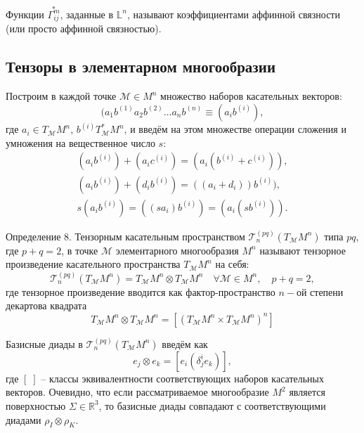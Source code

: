\documentclass[14pt,a4paper]{extarticle}
\begin{document}
Функции $\overset{*}{\Gamma_{ij}^m}$, заданные в $\mathbb{L}^n$, называют коэффициентами аффинной связности (или просто аффинной связностью).

\subsection{Тензоры в элементарном многообразии}
Построим в каждой точке $\mathcal{M} \in M^n$ множество наборов касательных векторов:
\begin{equation}\label{eq15}
	(a_1b^{(1)}a_2b^{(2)}\ldots a_nb^{(n)} \equiv (a_ib^{(i)}),
\end{equation}
где $a_i \in T_{\mathcal{M}}M^n$, $b^{(i)} T_{\mathcal{M}}^*M^n$, и введём на этом множестве операции сложения и умножения на вещественное число $s$:
\begin{align}
	(a_ib^{(i)}) + (a_ic^{(i)}) = (a_i(b^{(i)} + c^{(i)})),\label{eq16}\\
	(a_ib^{(i)}) + (d_ib^{(i)}) = ((a_i+d_i)) b^{(i)}),\label{eq17}\\
	s(a_ib^{(i)}) = ((sa_i)b^{(i)}) = (a_i(sb^{(i)})). \label{eq18}
\end{align}

Определение 8. Тензорным касательным пространством $\mathcal{T}_n^{(pq)}(T_{\mathcal{M}}M^n)$ типа $pq$, где $p+q=2$, в точке $\mathcal{M}$ элементарного многообразия $M^n$ называют тензорное произведение касательного пространства $T_{\mathcal{M}}M^n$ на себя:
\begin{equation}\label{eq19}
	\mathcal{T}_{n}^{(p q)}\left(T_{\mathcal{M}} M^{n}\right)=T_{\mathcal{M}} M^{n} \otimes T_{\mathcal{M}} M^{n} \quad \forall \mathcal{M} \in M^{n}, \quad p+q=2,
\end{equation}
где тензорное произведение вводится как фактор-пространство $n-$ой степени декартова квадрата
\begin{equation}\label{eq20}
	T_{\mathcal{M}}M^n \otimes T_{\mathcal{M}}M^n = [(T_{\mathcal{M}}M^n \times T_{\mathcal{M}}M^n)^n]
\end{equation}

Базисные диады в $\mathcal{T}_n^{(pq)}(T_{\mathcal{M}}M^n)$ введём как
\begin{equation}\label{eq21}
	e_j \otimes e_k = [e_i(\delta_j^ie_k)],
\end{equation}
где $[\;]$ -- классы эквивалентности соответствующих наборов касательных векторов. Очевидно, что если рассматриваемое многообразие $M^2$ является поверхностью $\Sigma \in \mathbb{R}^3$, то базисные диады совпадают с соответствующими диадами $\rho_I \otimes \rho_K$.
\end{document}
